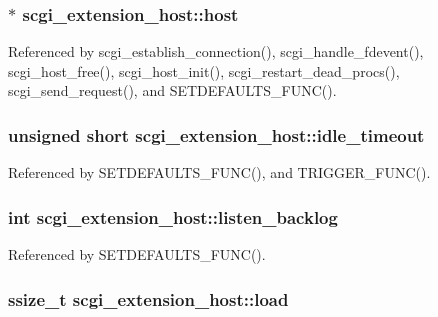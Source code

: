 \hypertarget{structscgi__extension__host_a19333859ef63c093f691c59528426bcd}{
\subsubsection[{host}]{$\ast$ scgi\-\_\-extension\-\_\-host\-::host}}\label{structscgi__extension__host_a19333859ef63c093f691c59528426bcd}


Referenced by scgi\-\_\-establish\-\_\-connection(), scgi\-\_\-handle\-\_\-fdevent(), scgi\-\_\-host\-\_\-free(), scgi\-\_\-host\-\_\-init(), scgi\-\_\-restart\-\_\-dead\-\_\-procs(), scgi\-\_\-send\-\_\-request(), and S\-E\-T\-D\-E\-F\-A\-U\-L\-T\-S\-\_\-\-F\-U\-N\-C().

\hypertarget{structscgi__extension__host_a4cebe533f3a1c863e6f363e60cfc3d02}{
\subsubsection[{idle\-\_\-timeout}]{\setlength{\rightskip}{0pt plus 5cm}unsigned short scgi\-\_\-extension\-\_\-host\-::idle\-\_\-timeout}}\label{structscgi__extension__host_a4cebe533f3a1c863e6f363e60cfc3d02}


Referenced by S\-E\-T\-D\-E\-F\-A\-U\-L\-T\-S\-\_\-\-F\-U\-N\-C(), and T\-R\-I\-G\-G\-E\-R\-\_\-\-F\-U\-N\-C().

\hypertarget{structscgi__extension__host_ac7e65359015911a546e96bc74813b5be}{
\subsubsection[{listen\-\_\-backlog}]{\setlength{\rightskip}{0pt plus 5cm}int scgi\-\_\-extension\-\_\-host\-::listen\-\_\-backlog}}\label{structscgi__extension__host_ac7e65359015911a546e96bc74813b5be}


Referenced by S\-E\-T\-D\-E\-F\-A\-U\-L\-T\-S\-\_\-\-F\-U\-N\-C().

\hypertarget{structscgi__extension__host_aae93d0863bca7743a7d8c7409ee901bc}{
\subsubsection[{load}]{\setlength{\rightskip}{0pt plus 5cm}ssize\-\_\-t scgi\-\_\-extension\-\_\-host\-::load}}\label{structscgi__extension__host_aae93d0863bca7743a7d8c7409ee901bc}



